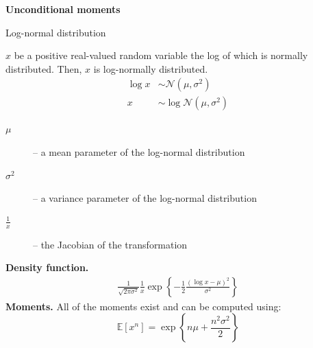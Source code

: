 \documentclass[notes,blackandwhite,mathsans,usenames,dvipsnames]{beamer}
\begin{document}
{
\begin{frame}

\begin{adjustwidth}{-0.5cm}{0cm}
\vspace{8.3cm}\Large
\textbf{{\color{mcxs2}Unconditional} {\color{purple}moments} }
\end{adjustwidth}

\end{frame}
}



\begin{frame}{Log-normal distribution}

 $x$ {\color{mcxs2}be a positive real-valued random variable the log of which is normally distributed.} {\color{mcxs2}Then,} $x$ {\color{mcxs2}is} {\color{purple}log-normally distributed}.
\begin{align*}
\log x &\sim\mathcal{N}\left(\mu, \sigma^2\right)\\[1ex]
x &\sim\log\mathcal{N}\left(\mu, \sigma^2\right)
\end{align*}
\begin{description}
\item[$\mu$] {\color{mcxs2}-- a mean parameter of the log-normal distribution}
\item[$\sigma^2$] {\color{mcxs2}-- a variance parameter of the log-normal distribution}
\item[$\frac{1}{x}$] {\color{mcxs2}-- the Jacobian of the transformation}
\end{description}

\bigskip\textbf{Density function.}
\begin{align*}
\frac{1}{\sqrt{2\pi\sigma^2}}\frac{1}{x}\exp\left\{ -\frac{1}{2}\frac{(\log x - \mu)^2}{\sigma^2} \right\}
\end{align*}
\textbf{Moments.} {\color{mcxs2}All of the moments exist and can be computed using:}
$$ \mathbb{E}[x^n]=\exp\left\{ n\mu+\frac{n^2\sigma^2}{2} \right\} $$

\end{frame}
\end{document}

